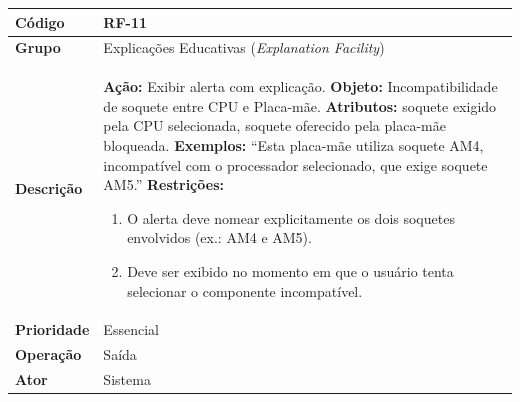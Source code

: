 \FloatBarrier
\begin{quadro}[htb]
  \caption{RF-11 -- Exibir alerta de incompatibilidade de soquete}
  \label{quad:rf11}
  \begin{tabular}{|p{3.2cm}|p{11.8cm}|}
    \hline
    \textbf{Código}     & RF-11                                                                     \\ \hline
    \textbf{Grupo}      & Explicações Educativas (\textit{Explanation Facility})                    \\ \hline
    \textbf{Descrição}  &
    \textbf{Ação:} Exibir alerta com explicação.
    \textbf{Objeto:} Incompatibilidade de soquete entre CPU e Placa-mãe.
    \textbf{Atributos:} soquete exigido pela CPU selecionada, soquete oferecido pela placa-mãe bloqueada.
    \textbf{Exemplos:} ``Esta placa-mãe utiliza soquete AM4, incompatível com o processador selecionado, que exige soquete AM5.''
    \textbf{Restrições:}
    \begin{enumerate}[nosep,leftmargin=1.2em,topsep=2pt,partopsep=0pt,parsep=0pt,itemsep=1pt]
      \item O alerta deve nomear explicitamente os dois soquetes envolvidos (ex.: AM4 e AM5).
      \item Deve ser exibido no momento em que o usuário tenta selecionar o componente incompatível.
    \end{enumerate} \\ \hline
    \textbf{Prioridade} & Essencial                                                                 \\ \hline
    \textbf{Operação}   & Saída                                                                     \\ \hline
    \textbf{Ator}       & Sistema                                                                   \\ \hline
  \end{tabular}
\end{quadro}

